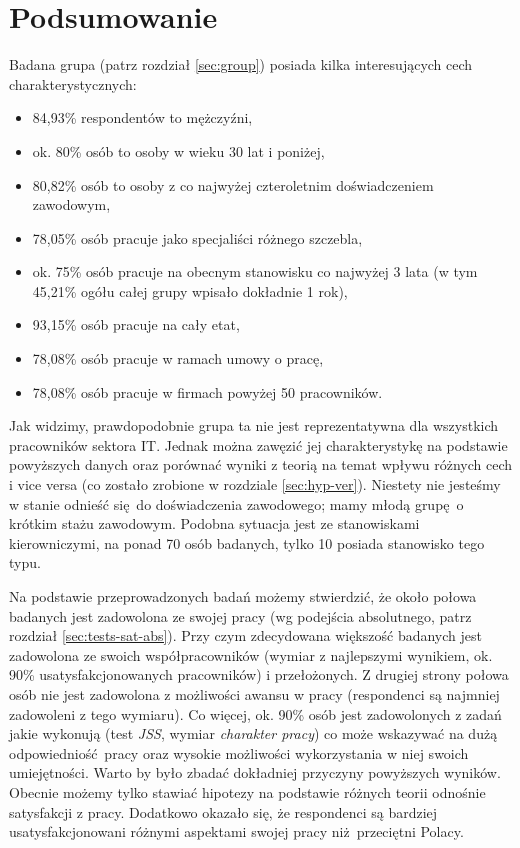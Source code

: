 \chapter{Podsumowanie}

Badana grupa (patrz rozdział \ref{sec:group}) posiada kilka interesujących cech charakterystycznych:
\begin{itemize}
  \item 84,93\% respondentów to mężczyźni,
  \item ok. 80\% osób to osoby w wieku 30 lat i poniżej,
  \item 80,82\% osób to osoby z co najwyżej czteroletnim doświadczeniem zawodowym,
  \item 78,05\% osób pracuje jako specjaliści różnego szczebla,
  \item ok. 75\% osób pracuje na obecnym stanowisku co najwyżej 3 lata (w tym 45,21\% ogółu całej grupy wpisało dokładnie 1 rok),
  \item 93,15\% osób pracuje na cały etat,
  \item 78,08\% osób pracuje w ramach umowy o pracę,
  \item 78,08\% osób pracuje w firmach powyżej 50 pracowników.
\end{itemize}
Jak widzimy, prawdopodobnie grupa ta nie jest reprezentatywna dla wszystkich pracowników sektora IT. Jednak można zawęzić jej charakterystykę na podstawie powyższych danych oraz porównać wyniki z teorią na temat wpływu różnych cech i vice versa (co zostało zrobione w rozdziale \ref{sec:hyp-ver}). Niestety nie jesteśmy w stanie odnieść się do doświadczenia zawodowego; mamy młodą grupę o krótkim stażu zawodowym. Podobna sytuacja jest ze stanowiskami kierowniczymi, na ponad 70 osób badanych, tylko 10 posiada stanowisko tego typu.

Na podstawie przeprowadzonych badań możemy stwierdzić, że około połowa badanych jest zadowolona ze swojej pracy (wg podejścia absolutnego, patrz rozdział \ref{sec:tests-sat-abs}). Przy czym zdecydowana większość badanych jest zadowolona ze swoich współpracowników (wymiar z najlepszymi wynikiem, ok. 90\% usatysfakcjonowanych pracowników) i przełożonych. Z drugiej strony połowa osób nie jest zadowolona z możliwości awansu w pracy (respondenci są
najmniej zadowoleni z tego wymiaru). Co więcej, ok. 90\% osób jest zadowolonych z zadań jakie wykonują (test \emph{JSS}, wymiar \textit{charakter pracy}) co może wskazywać na dużą odpowiedniość pracy oraz wysokie możliwości wykorzystania w niej swoich umiejętności. Warto by było zbadać dokładniej przyczyny powyższych wyników. Obecnie możemy tylko stawiać hipotezy na podstawie różnych teorii odnośnie satysfakcji z pracy.  Dodatkowo okazało się, że respondenci są bardziej usatysfakcjonowani różnymi aspektami swojej pracy niż przeciętni Polacy.

